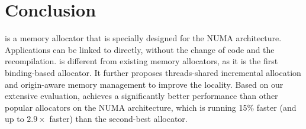 \section{Conclusion}
\label{sec:conclusion}

\NM{} is a memory allocator that is specially designed for the NUMA architecture. Applications can be linked to \NM{} directly, without the change of code and the recompilation. \NM{} is different from existing memory allocators, as it is the first binding-based allocator. It further proposes threads-shared incremental allocation and origin-aware memory management to improve the locality. 
Based on our extensive evaluation, \NM{} achieves a significantly better performance than other popular allocators on the NUMA architecture, which is running 15\% faster (and up to $2.9\times$ faster) than the second-best allocator.
